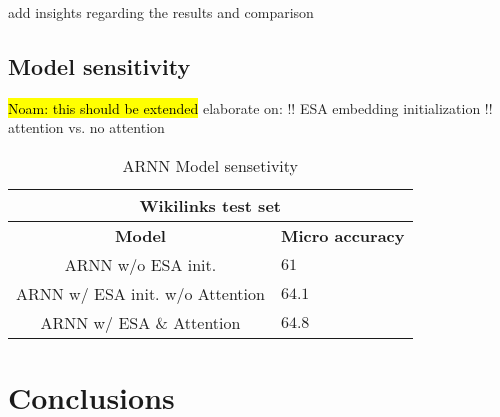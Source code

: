 \documentclass[11pt]{article}
\begin{document}
	add insights regarding the results and comparison 
	\subsection{Model sensitivity}
	
	\hl{Noam: this should be extended} elaborate on: \newline
	!! ESA embedding initialization \newline
	!! attention vs. no attention\newline
	
	\begin{table}[h]
	\begin{center}
		\begin{tabular}{|c| p{1.5cm}|}
			\hline \multicolumn{2}{|c|}{Wikilinks test set} \\
			\hline \bf Model & \bf Micro     accuracy  \\ \hline
			ARNN w/o ESA init. & $61$ \\
			ARNN w/ ESA init. w/o Attention & $64.1$ \\
			ARNN w/ ESA \& Attention & $64.8$ \\ 
			\hline
		\end{tabular}
	\end{center}
	\caption{\label{tab:c} ARNN Model sensetivity}
	\end{table}

	\section{Conclusions}
	
	
	
	
\end{document}

